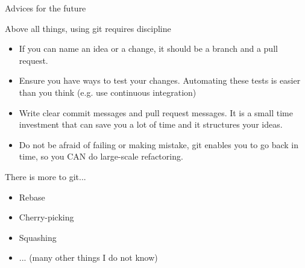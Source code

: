 \documentclass[c,11pt,xcolor=dvipsnames, aspectratio=169]{beamer}
\begin{document}
\begin{frame}{Advices for the future}

	\begin{block}{Above all things, using git requires discipline}
		\begin{itemize}
		\item If you can name an idea or a change, it should be a branch and a pull request.
		\item Ensure you have ways to test your changes. Automating these tests is easier than you think (e.g. use continuous integration)
		\item Write clear commit messages and pull request messages. It is a small time investment that can save you a lot of time and it structures your ideas.
		\item Do not be afraid of failing or making mistake, git enables you to go back in time, so you CAN do large-scale refactoring.
		\end{itemize}
	\end{block}

	\begin{block}{There is more to git...}
		\begin{itemize}
		\item Rebase
		\item Cherry-picking
		\item Squashing
		\item ... (many other things I do not know)
		\end{itemize}
	\end{block}

\end{frame}
\end{document}
